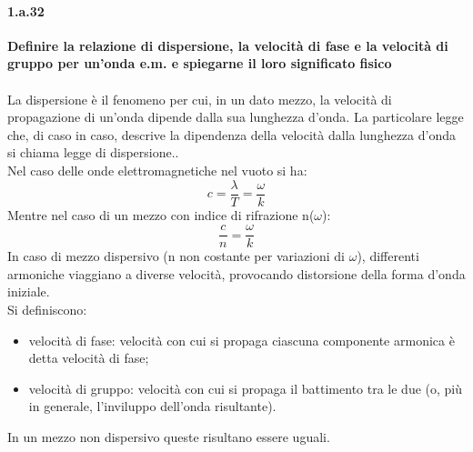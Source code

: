 \documentclass[twoside]{article}
\begin{document}
\paragraph{1.a.32} \textbf{Definire la relazione di dispersione, la velocità di fase e la velocità di gruppo per
un’onda e.m. e spiegarne il loro significato fisico}\\
\\
La dispersione è il fenomeno per cui, in un dato mezzo, la velocità di propagazione di un'onda dipende dalla sua lunghezza d'onda. La particolare legge che, di caso in caso, descrive la dipendenza della velocità dalla lunghezza d'onda si chiama legge di dispersione..\\
Nel caso delle onde elettromagnetiche nel vuoto si ha:
\begin{equation}
    c=\frac{\lambda}{T}=\frac{\omega}{k}
\end{equation}
Mentre nel caso di un mezzo con indice di rifrazione n($\omega$):
\begin{equation}
    \frac{c}{n}=\frac{\omega}{k}
\end{equation}
In caso di mezzo dispersivo (n non costante per variazioni di $\omega$), differenti armoniche viaggiano a diverse velocità, provocando distorsione della forma d'onda iniziale.\\
Si definiscono:
\begin{itemize}
    \item velocità di fase: velocità con cui si propaga ciascuna componente armonica è detta velocità di fase;
    \item velocità di gruppo: velocità con cui si propaga il battimento tra le due (o, più in generale, l'inviluppo dell'onda risultante).
\end{itemize}
In un mezzo non dispersivo queste risultano essere uguali.\\
\end{document}
